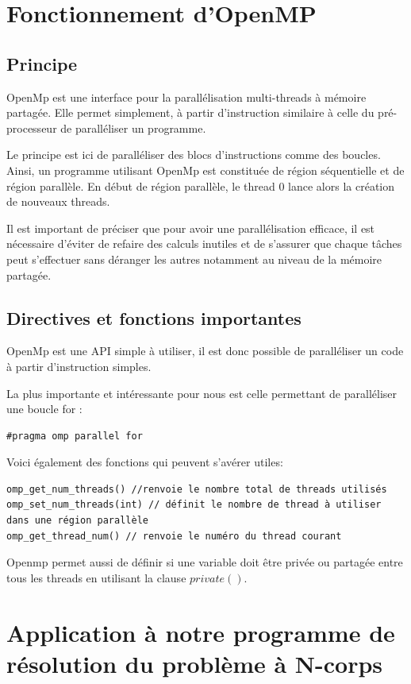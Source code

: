 \section{Fonctionnement d'OpenMP}
\subsection{Principe}
OpenMp est une interface pour la parallélisation multi-threads à mémoire partagée. Elle permet simplement, à partir d'instruction similaire à celle du pré-processeur de paralléliser un programme.

Le principe est ici de paralléliser des blocs d'instructions comme des boucles. Ainsi, un programme utilisant OpenMp est constituée de région séquentielle et de région parallèle. En début de région parallèle, le thread 0 lance alors la création de nouveaux threads.

Il est important de préciser que pour avoir une parallélisation efficace, il est nécessaire d'éviter de refaire des calculs inutiles et de s'assurer que chaque tâches peut s'effectuer sans déranger les autres notamment au niveau de la mémoire partagée.

\subsection{Directives et fonctions importantes}
OpenMp est une API simple à utiliser, il est donc possible de paralléliser un code à partir d'instruction simples.

La plus importante et intéressante pour nous est celle permettant de paralléliser une boucle for :

\begin{lstlisting}
#pragma omp parallel for
\end{lstlisting}

Voici également des fonctions qui peuvent s'avérer utiles:

\begin{lstlisting}
omp_get_num_threads() //renvoie le nombre total de threads utilisés
omp_set_num_threads(int) // définit le nombre de thread à utiliser dans une région parallèle
omp_get_thread_num() // renvoie le numéro du thread courant
\end{lstlisting}

Openmp permet aussi de définir si une variable doit être privée ou partagée entre tous les threads en utilisant la clause $private()$.

\section{Application à notre programme de résolution du problème à N-corps}

